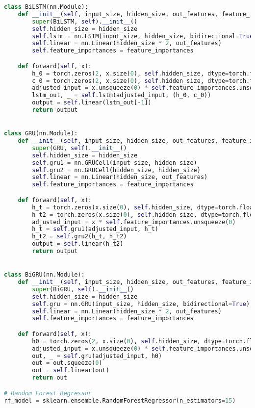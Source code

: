 \begin{lstlisting}[language=Python,label={lst:ml.py}, basicstyle=\scriptsize]
class BiLSTM(nn.Module):
    def __init__(self, input_size, hidden_size, out_features, feature_importances):
        super(BiLSTM, self).__init__()
        self.hidden_size = hidden_size
        self.lstm = nn.LSTM(input_size, hidden_size, bidirectional=True)
        self.linear = nn.Linear(hidden_size * 2, out_features)
        self.feature_importances = feature_importances

    def forward(self, x):
        h_0 = torch.zeros(2, x.size(0), self.hidden_size, dtype=torch.float32)
        c_0 = torch.zeros(2, x.size(0), self.hidden_size, dtype=torch.float32)
        adjusted_input = x.unsqueeze(0) * self.feature_importances.unsqueeze(0)
        lstm_out, _ = self.lstm(adjusted_input, (h_0, c_0))
        output = self.linear(lstm_out[-1])
        return output


class GRU(nn.Module):
    def __init__(self, input_size, hidden_size, out_features, feature_importances):
        super(GRU, self).__init__()
        self.hidden_size = hidden_size
        self.gru1 = nn.GRUCell(input_size, hidden_size)
        self.gru2 = nn.GRUCell(hidden_size, hidden_size)
        self.linear = nn.Linear(hidden_size, out_features)
        self.feature_importances = feature_importances

    def forward(self, x):
        h_t = torch.zeros(x.size(0), self.hidden_size, dtype=torch.float32)
        h_t2 = torch.zeros(x.size(0), self.hidden_size, dtype=torch.float32)
        adjusted_input = x * self.feature_importances.unsqueeze(0)
        h_t = self.gru1(adjusted_input, h_t)
        h_t2 = self.gru2(h_t, h_t2)
        output = self.linear(h_t2)
        return output


class BiGRU(nn.Module):
    def __init__(self, input_size, hidden_size, out_features, feature_importances):
        super(BiGRU, self).__init__()
        self.hidden_size = hidden_size
        self.gru = nn.GRU(input_size, hidden_size, bidirectional=True)
        self.linear = nn.Linear(hidden_size * 2, out_features)
        self.feature_importances = feature_importances

    def forward(self, x):
        h0 = torch.zeros(2, x.size(0), self.hidden_size, dtype=torch.float32)
        adjusted_input = x.unsqueeze(0) * self.feature_importances.unsqueeze(0)
        out, _ = self.gru(adjusted_input, h0)
        out = out.squeeze(0)
        out = self.linear(out)
        return out

# Random Forest Regressor
rf_model = sklearn.ensemble.RandomForestRegressor(n_estimators=15)
\end{lstlisting}